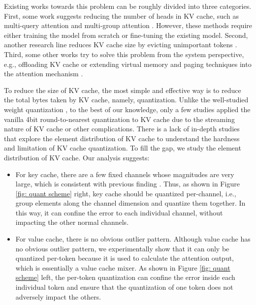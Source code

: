 Existing works towards this problem can be roughly divided into three categories. First, some work suggests reducing the number of heads in KV cache, such as multi-query attention \citep{mqa} and multi-group attention \citep{gqa}. However, these methods require either training the model from scratch or fine-tuning the existing model. Second, another research line reduces KV cache size by evicting unimportant tokens \citep{h2o}. Third, some other works try to solve this problem from the system perspective, e.g., offloading KV cache \citep{flexgen} or extending virtual memory and paging techniques into the attention mechanism \citep{vllm}.

To reduce the size of KV cache, the most simple and effective way is to reduce the total bytes taken by KV cache, namely, quantization. Unlike the well-studied weight quantization \citep{lin2023awq, xiao2023smoothquant, zhao2024atom}, to the best of our knowledge, only a few studies applied the vanilla 4bit round-to-nearest quantization to KV cache \citep{flexgen, h2o, zhao2024atom} due to the streaming nature of KV cache or other complications. There is a lack of in-depth studies that explore the element distribution of KV cache to understand the hardness and limitation of KV cache quantization. To fill the gap, we study the element distribution of KV cache. Our analysis suggests:

\begin{itemize}
    \item For key cache, there are a few fixed channels whose magnitudes are very large, which is consistent with previous finding \citep{lin2023awq, xiao2023smoothquant}. Thus, as shown in Figure \ref{fig: quant scheme} right, key cache should be quantized per-channel, i.e., group elements along the channel dimension and quantize them together. In this way, it can confine the error to each individual channel, without impacting the other normal channels.
     \item For value cache, there is no obvious outlier pattern. Although value cache has no obvious outlier pattern, we experimentally show that it can only be quantized per-token because it is used to calculate the attention output, which is essentially a value cache mixer. As shown in Figure \ref{fig: quant scheme} left, the per-token quantization can confine the error inside each individual token and ensure that the quantization of one token does not adversely impact the others.

\end{itemize}

